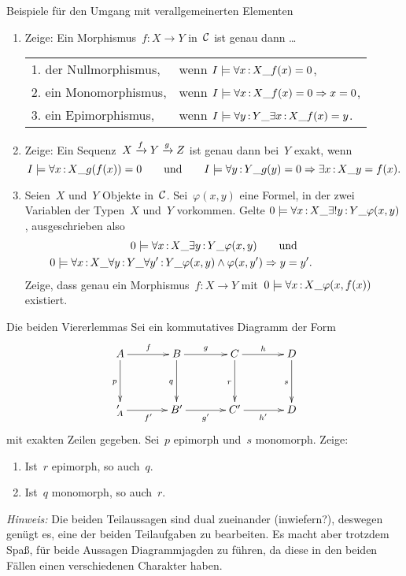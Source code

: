 \documentclass{uebblatt}
\begin{document}
\begin{aufgabe}{Beispiele für den Umgang mit verallgemeinerten Elementen}
\begin{enumerate}
\item Zeige: Ein Morphismus~$f : X \to Y$ in~$\mathcal{C}$ ist genau dann \ldots

\renewcommand{\arraystretch}{1.2}
\begin{tabular}{ll}
  1. der Nullmorphismus, & wenn
  $I \models \forall x\,{:}\,X\_ f(x) = 0$, \\
  2. ein Monomorphismus, & wenn
  $I \models \forall x\,{:}\,X\_ f(x) = 0 \Rightarrow x = 0$, \\
  3. ein Epimorphismus, & wenn
  $I \models \forall y\,{:}\,Y\_ \exists x\,{:}\,X\_ f(x) = y$.
\end{tabular}

\item Zeige: Ein Sequenz~$X \xrightarrow{f} Y \xrightarrow{g} Z$ ist genau dann bei~$Y$ exakt,
wenn
\[ I \models \forall x\,{:}\,X\_ g(f(x)) = 0
  \qquad\text{und}\qquad
  I \models \forall y\,{:}\,Y\_ g(y) = 0 \Rightarrow \exists x\,{:}\,X\_ y = f(x). \]

\item Seien~$X$ und~$Y$ Objekte in~$\mathcal{C}$. Sei~$\varphi(x,y)$ eine Formel, in der
zwei Variablen der Typen~$X$ und~$Y$ vorkommen. Gelte
$0 \models \forall x\,{:}\,X\_ \exists!y\,{:}\,Y\_ \varphi(x,y)$, ausgeschrieben also
\begin{multline*}0 \models \forall x\,{:}\,X\_ \exists y\,{:}\,Y\_ \varphi(x,y)
  \qquad\text{und} \\
  0 \models \forall x\,{:}\,X\_ \forall y\,{:}\,Y\_ \forall y'\,{:}\,Y\_ \varphi(x,y) \wedge \varphi(x,y')
  \Rightarrow y = y'. {\qquad\qquad\qquad} \end{multline*}
Zeige, dass genau ein Morphismus~$f : X \to Y$ mit~$0 \models \forall
x\,{:}\,X\_ \varphi(x,f(x))$ existiert.
\end{enumerate}
\end{aufgabe}

\newpage

\begin{aufgabe}{Die beiden Viererlemmas}
Sei ein kommutatives Diagramm der Form
\[ \xymatrixcolsep{3pc}\xymatrixrowsep{3pc}\xymatrix{
  A \ar[r]^f \ar[d]_p & B \ar[r]^g \ar[d]_q & C \ar[r]^h \ar[d]_r & D \ar[d]_s \\
_  A' \ar[r]_{f'} & B' \ar[r]_{g'} & C' \ar[r]_{h'} & D
} \]
mit exakten Zeilen gegeben. Sei~$p$ epimorph und~$s$ monomorph.
Zeige:
\begin{enumerate}
\item Ist~$r$ epimorph, so auch~$q$.
\item Ist~$q$ monomorph, so auch~$r$.
\end{enumerate}
\emph{Hinweis:} Die beiden Teilaussagen sind dual zueinander (inwiefern?),
deswegen genügt es, eine der beiden Teilaufgaben zu bearbeiten. Es macht aber
trotzdem Spaß, für beide Aussagen Diagrammjagden zu führen, da diese in den
beiden Fällen einen verschiedenen Charakter haben.
\end{aufgabe}
\end{document}
